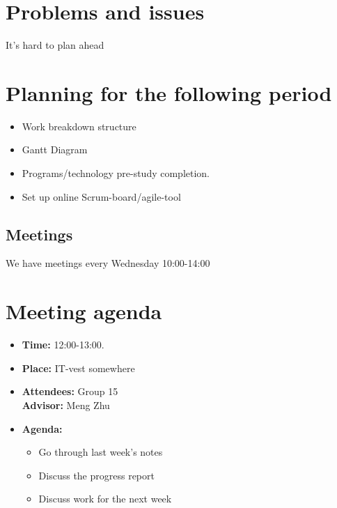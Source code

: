 \documentclass[12pt, a4paper]{article}
\begin{document}
\section{Problems and issues}
It's hard to plan ahead
\section{Planning for the following period}
\begin{itemize}
\item  Work breakdown structure
\item  Gantt Diagram
\item  Programs/technology pre-study completion.
\item  Set up online Scrum-board/agile-tool
\end{itemize}
\subsection{Meetings}
We have meetings every Wednesday 10:00-14:00

\newpage
\section{Meeting agenda }
\begin{itemize}
\item \textbf{Time:} 12:00-13:00.
\item \textbf{Place:} IT-vest somewhere\\
\item \textbf{Attendees:} Group 15 \\ \textbf{Advisor:} Meng Zhu
\item \textbf{Agenda:} \begin{itemize}
							\item Go through last week's notes
							\item Discuss the progress report
							\item Discuss work for the next week
						\end{itemize}
\end{itemize}
\end{document}
